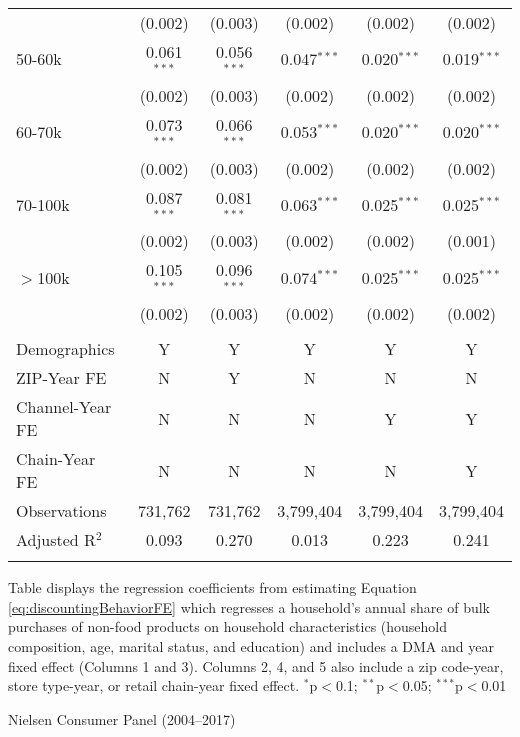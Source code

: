\begin{table}[!htbp]
{\begin{tabular}{lccccc}
  & (0.002) & (0.003) & (0.002) & (0.002) & (0.002) \\
  50-60k & 0.061$^{***}$ & 0.056$^{***}$ & 0.047$^{***}$ & 0.020$^{***}$ & 0.019$^{***}$ \\
  & (0.002) & (0.003) & (0.002) & (0.002) & (0.002) \\
  60-70k & 0.073$^{***}$ & 0.066$^{***}$ & 0.053$^{***}$ & 0.020$^{***}$ & 0.020$^{***}$ \\
  & (0.002) & (0.003) & (0.002) & (0.002) & (0.002) \\
  70-100k & 0.087$^{***}$ & 0.081$^{***}$ & 0.063$^{***}$ & 0.025$^{***}$ & 0.025$^{***}$ \\
  & (0.002) & (0.003) & (0.002) & (0.002) & (0.001) \\
  $>$100k & 0.105$^{***}$ & 0.096$^{***}$ & 0.074$^{***}$ & 0.025$^{***}$ & 0.025$^{***}$ \\
  & (0.002) & (0.003) & (0.002) & (0.002) & (0.002) \\
 \hline \\[-1.8ex]
Demographics & Y & Y & Y & Y & Y \\
ZIP-Year FE & N & Y & N & N & N \\
Channel-Year FE & N & N & N & Y & Y \\
Chain-Year FE & N & N & N & N & Y \\
Observations & 731,762 & 731,762 & 3,799,404 & 3,799,404 & 3,799,404 \\
Adjusted R$^{2}$ & 0.093 & 0.270 & 0.013 & 0.223 & 0.241 \\
\hline
\hline \\[-1.8ex]
\end{tabular}
}
\begin{tablenotes}
Table displays the regression coefficients from estimating Equation \ref{eq:discountingBehaviorFE} which regresses a household's annual share of bulk purchases of non-food products on household characteristics (household composition, age, marital status, and education) and includes a DMA and year fixed effect (Columns 1 and 3). Columns 2, 4, and 5 also include a zip code-year, store type-year, or retail chain-year fixed effect. $^{*}$p$<$0.1; $^{**}$p$<$0.05; $^{***}$p$<$0.01
\end{tablenotes}
\begin{tablenotes}[Source]
Nielsen Consumer Panel (2004--2017)
\end{tablenotes}
\end{table}
